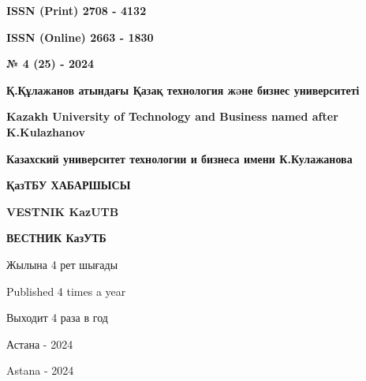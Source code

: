 \begin{flushright}
\textbf{ISSN (Print) 2708 - 4132}

\textbf{ISSN (Online) 2663 - 1830}

\vspace{1cm}

\textbf{№ 4 (25) - 2024}
\end{flushright}

\vfill

\begin{center}
\textbf{\large Қ.Құлажанов атындағы Қазақ технология жəне бизнес университеті}

\vspace{0.3cm}

\textbf{\large Kazakh University of Technology and Business named after K.Kulazhanov}

\vspace{0.3cm}

\textbf{\large Казахский университет технологии и бизнеса имени К.Кулажанова}

\vfill

\textbf{\huge ҚазТБУ ХАБАРШЫСЫ}

\vspace{0.5cm}

\textbf{\huge VESTNIK KazUTB}

\vspace{0.5cm}

\textbf{\huge ВЕСТНИК КазУТБ}

\vfill

Жылына 4 рет шығады

Published 4 times a year

Выходит 4 раза в год

\vfill

Астана - 2024

Astana - 2024
\end{center}

